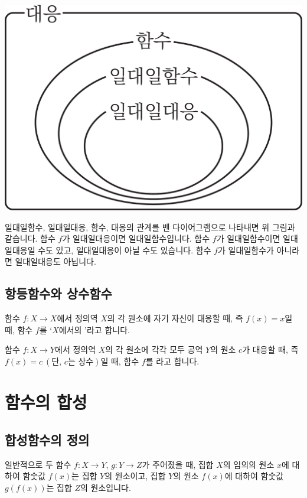 \begin{center} \includegraphics[scale=\pgfkeysvalueof{picsize}]{DBs/pic/zerg_02.pdf}\\
	\end{center}일대일함수, 일대일대응, 함수, 대응의 관계를 벤 다이어그램으로 나타내면 위 그림과 같습니다. 함수 $f$가 일대일대응이면 일대일함수입니다. 함수 $f$가 일대일함수이면 일대일대응일 수도 있고, 일대일대응이 아닐 수도 있습니다. 함수 $f$가 일대일함수가 아니라면 일대일대응도 아닙니다. 

\subsection{항등함수와 상수함수}
함수 $f:X \longrightarrow X$에서 정의역 $X$의 각 원소에 자기 자신이 대응할 때, 즉 $f\left( x \right) = x$일 때, 함수 $f$를 `$X$에서의 '라고 합니다.

함수 $f:X \longrightarrow Y$에서 정의역 $X$의 각 원소에 각각 모두 공역 $Y$의 원소 $c$가 대응할 때, 즉 $f\left( x \right) = c\:\left( \text{단, $c$는 상수} \right) $일 때, 함수 $f$를 라고 합니다.
\clearpage
\section{함수의 합성}
\subsection{합성함수의 정의}
일반적으로 두 함수 $f:X \longrightarrow Y$, $g:Y \longrightarrow Z$가 주어졌을 때, 집합 $X$의 임의의 원소 $x$에 대하여 함숫값 $f\left( x \right) $는 집합 $Y$의 원소이고, 집합 $Y$의 원소 $f\left( x \right) $에 대하여 함숫값 $g\left( f\left( x \right)  \right) $는 집합 $Z$의 원소입니다. 

